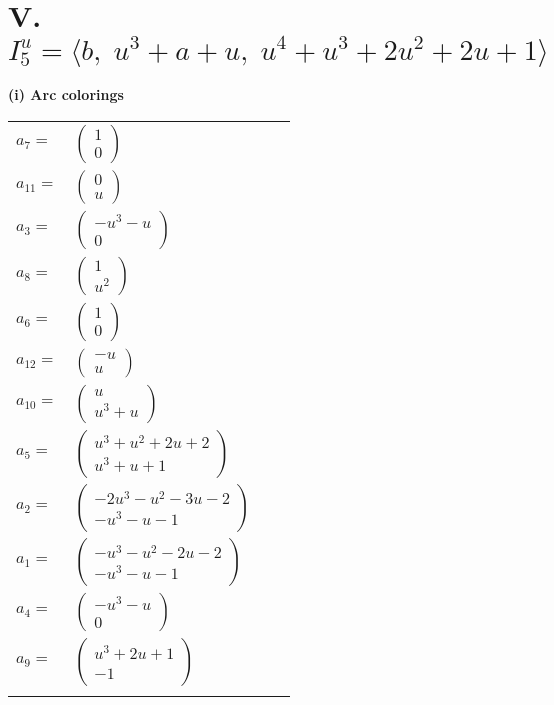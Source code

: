 \documentclass[1p]{elsarticle_modified}
\theoremstyle{definition}
\begin{document}
\centering \section*{V. $I^u_{5}= \langle b,\;u^3+a+u,\;u^4+u^3+2 u^2+2 u+1 \rangle$}
\flushleft \textbf{(i) Arc colorings}\\
\begin{tabular}{m{7pt} m{180pt} m{7pt} m{180pt} }
\flushright $a_{7}=$&$\begin{pmatrix}1\\0\end{pmatrix}$ \\
\flushright $a_{11}=$&$\begin{pmatrix}0\\u\end{pmatrix}$ \\
\flushright $a_{3}=$&$\begin{pmatrix}- u^3- u\\0\end{pmatrix}$ \\
\flushright $a_{8}=$&$\begin{pmatrix}1\\u^2\end{pmatrix}$ \\
\flushright $a_{6}=$&$\begin{pmatrix}1\\0\end{pmatrix}$ \\
\flushright $a_{12}=$&$\begin{pmatrix}- u\\u\end{pmatrix}$ \\
\flushright $a_{10}=$&$\begin{pmatrix}u\\u^3+u\end{pmatrix}$ \\
\flushright $a_{5}=$&$\begin{pmatrix}u^3+u^2+2 u+2\\u^3+u+1\end{pmatrix}$ \\
\flushright $a_{2}=$&$\begin{pmatrix}-2 u^3- u^2-3 u-2\\- u^3- u-1\end{pmatrix}$ \\
\flushright $a_{1}=$&$\begin{pmatrix}- u^3- u^2-2 u-2\\- u^3- u-1\end{pmatrix}$ \\
\flushright $a_{4}=$&$\begin{pmatrix}- u^3- u\\0\end{pmatrix}$ \\
\flushright $a_{9}=$&$\begin{pmatrix}u^3+2 u+1\\-1\end{pmatrix}$\\&\end{tabular}
\end{document}
